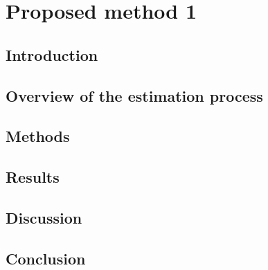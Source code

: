 \chapter{Proposed method 1}
\label{chapter:method_1} 


\section{Introduction}

\lipsum[2-4]

\section{Overview of the estimation process}

\lipsum[2-4]

\section{Methods}

\lipsum[2-4]

\section{Results}

\lipsum[2-4]

\section{Discussion}

\lipsum[2-4]

\section{Conclusion}

\lipsum[2-4]